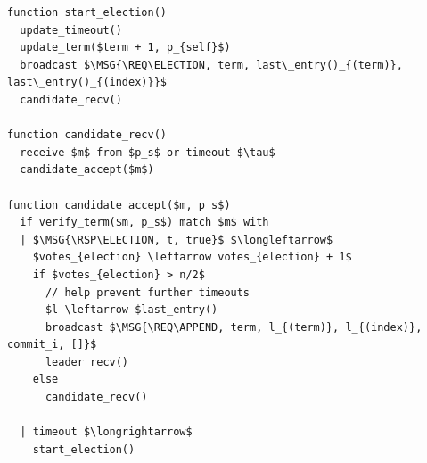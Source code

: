 \documentclass{article}
\begin{document}
	\begin{mdframed}[backgroundcolor=Papyrus]
	\begin{lstlisting}[style=pseudo, caption={Candidate logic.}]
function start_election()
  update_timeout()
  update_term($term + 1, p_{self}$)
  broadcast $\MSG{\REQ\ELECTION, term, last\_entry()_{(term)}, last\_entry()_{(index)}}$
  candidate_recv()

function candidate_recv()
  receive $m$ from $p_s$ or timeout $\tau$
  candidate_accept($m$)

function candidate_accept($m, p_s$)
  if verify_term($m, p_s$) match $m$ with
  | $\MSG{\RSP\ELECTION, t, true}$ $\longleftarrow$
    $votes_{election} \leftarrow votes_{election} + 1$
    if $votes_{election} > n/2$
      // help prevent further timeouts
      $l \leftarrow $last_entry()
      broadcast $\MSG{\REQ\APPEND, term, l_{(term)}, l_{(index)}, commit_i, []}$
      leader_recv()
    else
      candidate_recv()

  | timeout $\longrightarrow$
    start_election()
	\end{lstlisting}
	\end{mdframed}
\end{document}

